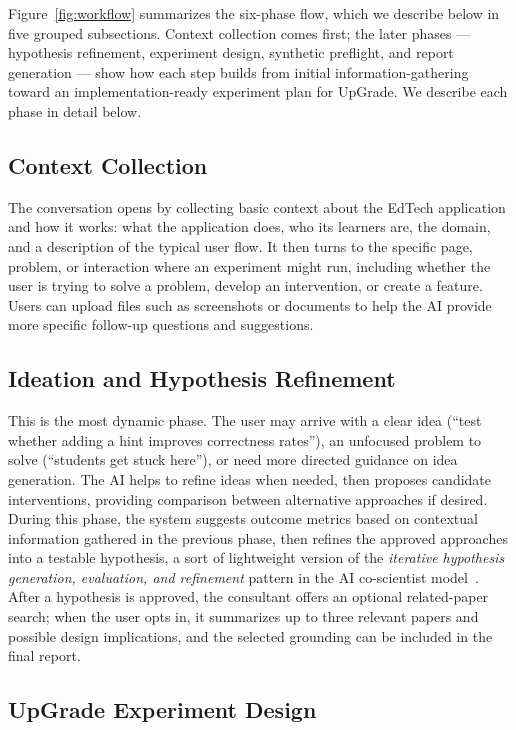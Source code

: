 \documentclass[manuscript,screen]{acmart}
\begin{document}
Figure~\ref{fig:workflow} summarizes the six-phase flow, which we describe below in five grouped subsections. Context collection comes first; the later phases --- hypothesis refinement, experiment design, synthetic preflight, and report generation --- show how each step builds from initial information-gathering toward an implementation-ready experiment plan for UpGrade. We describe each phase in detail below.

\subsection{Context Collection}

The conversation opens by collecting basic context about the EdTech application and how it works: what the application does, who its learners are, the domain, and a description of the typical user flow. It then turns to the specific page, problem, or interaction where an experiment might run, including whether the user is trying to solve a problem, develop an intervention, or create a feature. Users can upload files such as screenshots or documents to help the AI provide more specific follow-up questions and suggestions.

\subsection{Ideation and Hypothesis Refinement}

This is the most dynamic phase. The user may arrive with a clear idea (``test whether adding a hint improves correctness rates''), an unfocused problem to solve (``students get stuck here''), or need more directed guidance on idea generation. The AI helps to refine ideas when needed, then proposes candidate interventions, providing comparison between alternative approaches if desired. During this phase, the system suggests outcome metrics based on contextual information gathered in the previous phase, then refines the approved approaches into a testable hypothesis, a sort of lightweight version of the \emph{iterative hypothesis generation, evaluation, and refinement} pattern in the AI co-scientist model~\cite{ai-coscientist}. After a hypothesis is approved, the consultant offers an optional related-paper search; when the user opts in, it summarizes up to three relevant papers and possible design implications, and the selected grounding can be included in the final report.

\subsection{UpGrade Experiment Design}
\end{document}
